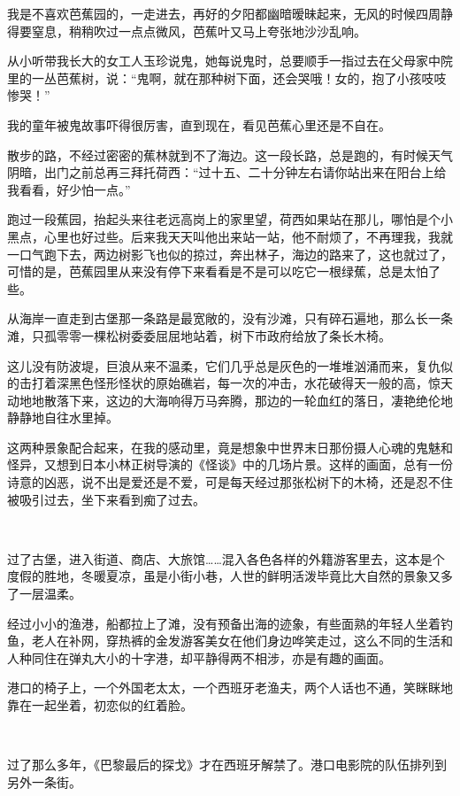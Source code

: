 \par 我是不喜欢芭蕉园的，一走进去，再好的夕阳都幽暗暧昧起来，无风的时候四周静得要窒息，稍稍吹过一点点微风，芭蕉叶又马上夸张地沙沙乱响。
\par 从小听带我长大的女工人玉珍说鬼，她每说鬼时，总要顺手一指过去在父母家中院里的一丛芭蕉树，说：“鬼啊，就在那种树下面，还会哭哦！女的，抱了小孩吱吱惨哭！”
\par 我的童年被鬼故事吓得很厉害，直到现在，看见芭蕉心里还是不自在。
\par 散步的路，不经过密密的蕉林就到不了海边。这一段长路，总是跑的，有时候天气阴暗，出门之前总再三拜托荷西：“过十五、二十分钟左右请你站出来在阳台上给我看看，好少怕一点。”
\par 跑过一段蕉园，抬起头来往老远高岗上的家里望，荷西如果站在那儿，哪怕是个小黑点，心里也好过些。后来我天天叫他出来站一站，他不耐烦了，不再理我，我就一口气跑下去，两边树影飞也似的掠过，奔出林子，海边的路来了，这也就过了，可惜的是，芭蕉园里从来没有停下来看看是不是可以吃它一根绿蕉，总是太怕了些。
\par 从海岸一直走到古堡那一条路是最宽敞的，没有沙滩，只有碎石遍地，那么长一条滩，只孤零零一棵松树委委屈屈地站着，树下市政府给放了条长木椅。
\par 这儿没有防波堤，巨浪从来不温柔，它们几乎总是灰色的一堆堆汹涌而来，复仇似的击打着深黑色怪形怪状的原始礁岩，每一次的冲击，水花破得天一般的高，惊天动地地散落下来，这边的大海响得万马奔腾，那边的一轮血红的落日，凄艳绝伦地静静地自往水里掉。
\par 这两种景象配合起来，在我的感动里，竟是想象中世界末日那份摄人心魂的鬼魅和怪异，又想到日本小林正树导演的《怪谈》中的几场片景。这样的画面，总有一份诗意的凶恶，说不出是爱还是不爱，可是每天经过那张松树下的木椅，还是忍不住被吸引过去，坐下来看到痴了过去。
\par  
\par 过了古堡，进入街道、商店、大旅馆……混入各色各样的外籍游客里去，这本是个度假的胜地，冬暖夏凉，虽是小街小巷，人世的鲜明活泼毕竟比大自然的景象又多了一层温柔。
\par 经过小小的渔港，船都拉上了滩，没有预备出海的迹象，有些面熟的年轻人坐着钓鱼，老人在补网，穿热裤的金发游客美女在他们身边哗笑走过，这么不同的生活和人种同住在弹丸大小的十字港，却平静得两不相涉，亦是有趣的画面。
\par 港口的椅子上，一个外国老太太，一个西班牙老渔夫，两个人话也不通，笑眯眯地靠在一起坐着，初恋似的红着脸。
\par  
\par 过了那么多年，《巴黎最后的探戈》才在西班牙解禁了。港口电影院的队伍排列到另外一条街。
